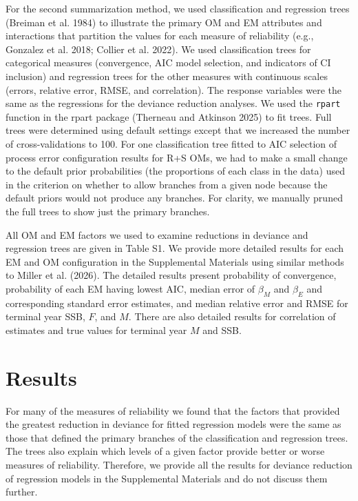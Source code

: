 \documentclass[
  12pt,
]{article}
\begin{document}
For the second summarization method, we used classification and
regression trees (Breiman et al. 1984) to illustrate the primary OM and
EM attributes and interactions that partition the values for each
measure of reliability (e.g., Gonzalez et al. 2018; Collier et al.
2022). We used classification trees for categorical measures
(convergence, AIC model selection, and indicators of CI inclusion) and
regression trees for the other measures with continuous scales (errors,
relative error, RMSE, and correlation). The response variables were the
same as the regressions for the deviance reduction analyses. We used the
\verb|rpart| function in the rpart package (Therneau and Atkinson 2025)
to fit trees. Full trees were determined using default settings except
that we increased the number of cross-validations to 100. For one
classification tree fitted to AIC selection of process error
configuration results for R+S OMs, we had to make a small change to the
default prior probabilities (the proportions of each class in the data)
used in the criterion on whether to allow branches from a given node
because the default priors would not produce any branches. For clarity,
we manually pruned the full trees to show just the primary branches.

All OM and EM factors we used to examine reductions in deviance and
regression trees are given in Table S1. We provide more detailed results
for each EM and OM configuration in the Supplemental Materials using
similar methods to Miller et al. (2026). The detailed results present
probability of convergence, probability of each EM having lowest AIC,
median error of \(\beta_M\) and \(\beta_E\) and corresponding standard
error estimates, and median relative error and RMSE for terminal year
SSB, \(F\), and \(M\). There are also detailed results for correlation
of estimates and true values for terminal year \(M\) and SSB.

\section*{Results}\label{results}

For many of the measures of reliability we found that the factors that
provided the greatest reduction in deviance for fitted regression models
were the same as those that defined the primary branches of the
classification and regression trees. The trees also explain which levels
of a given factor provide better or worse measures of reliability.
Therefore, we provide all the results for deviance reduction of
regression models in the Supplemental Materials and do not discuss them
further.
\end{document}
